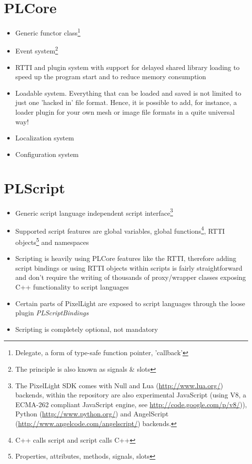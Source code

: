 \section{PLCore}
\begin{itemize}
\item{Generic functor class\footnote{Delegate, a form of type-safe function pointer, 'callback'}}
\item{Event system\footnote{The principle is also known as signals \& slots}}
\item{RTTI and plugin system with support for delayed shared library loading to speed up the program start and to reduce memory consumption}
\item{Loadable system. Everything that can be loaded and saved is not limited to just one 'hacked in' file format. Hence, it is possible to add, for instance, a loader plugin for your own mesh or image file formats in a quite universal way!}
\item{Localization system}
\item{Configuration system}
\end{itemize}




\section{PLScript}
\begin{itemize}
\item{Generic script language independent script interface\footnote{The PixelLight SDK comes with Null and Lua (\url{http://www.lua.org/}) backends, within the repository are also experimental JavaScript (using V8, a ECMA-262 compliant JavaScript engine, see \url{http://code.google.com/p/v8/})), Python (\url{http://www.python.org/}) and AngelScript (\url{http://www.angelcode.com/angelscript/}) backends.}}
\item{Supported script features are global variables, global functions\footnote{C++ calls script and script calls C++}, RTTI objects\footnote{Properties, attributes, methods, signals, slots} and namespaces}
\item{Scripting is heavily using PLCore features like the RTTI, therefore adding script bindings or using RTTI objects within scripts is fairly straightforward and don't require the writing of thousands of proxy/wrapper classes exposing C++ functionality to script languages}
\item{Certain parts of PixelLight are exposed to script languages through the loose plugin \emph{PLScriptBindings}}
\item{Scripting is completely optional, not mandatory}
\end{itemize}




